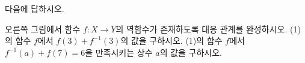 \hspace*{2mm}\begin{minipage}[t]{\dimexpr\linewidth-2mm\relax}\vspace{0pt}
\noindent\begin{minipage}[t]{0.58\linewidth}\vspace{0pt}\raggedright 다음에 답하시오.\end{minipage}\hfill\begin{minipage}[t]{0.4\linewidth}\vspace{0pt}\centering \resizebox{\ifdim\width>\linewidth\linewidth\else\width\fi}{!}{}\end{minipage}\par
{} 오른쪽 그림에서 함수 $f:X\longrightarrow Y$의 역함수가 존재하도록 대응 관계를 완성하시오.
 (1)의 함수 $f$에서 $f(3)+f^{-1}(3)$의 값을 구하시오.
 (1)의 함수 $f$에서 $f^{-1}(a)+f(7)=6$을 만족시키는 상수 $a$의 값을 구하시오.\end{minipage}
